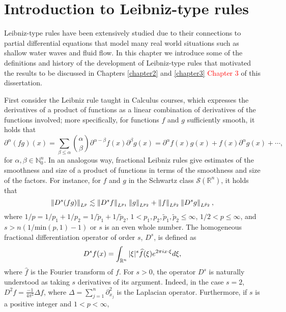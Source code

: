 
\cleardoublepage


\chapter{Introduction to Leibniz-type rules}
\label{makereference1}

Leibniz-type rules have been extensively studied due to their connections to partial differential equations that model many real world situations such as shallow water waves and fluid flow. In this chapter we introduce some of the definitions and history of the development of Leibniz-type rules that motivated the results to be discussed in Chapters \ref{chapter2} and \ref{chapter3} \textcolor{red}{Chapter 3} of this dissertation. 

First consider the Leibniz rule taught in Calculus courses, which expresses the derivatives of a product of functions as a linear combination of derivatives of the functions involved; more specifically, for functions $f$ and $g$ sufficiently smooth, it holds that
\[\partial^\alpha (fg)(x) = \sum_{\beta \leq \alpha} \binom{\alpha}{\beta} \partial^{\alpha - \beta} f(x) \partial^{\beta} g(x) = \partial^\alpha f(x) g(x) + f(x) \partial^\alpha g(x) + \cdots ,\]
for $\alpha,\beta \in \mathbb{N}^n_0$.
In an analogous way, fractional Leibniz rules give estimates of the smoothness and size of a product of functions in terms of the smoothness and size of the factors. For instance, for $f$ and $g$ in the Schwartz class $\mathcal{S}(\mathbb{R}^n)$, it holds that
\begin{equation}\label{def:leibniz}
\left\|D^s (fg)\right\|_{L^p} \lesssim \left\|D^s f\right\|_{L^{p_1}}\left\|g\right\|_{L^{p_2}} + \left\|f\right\|_{L^{\tilde{p}_2}}\left\|D^s g\right\|_{L^{\tilde{p}_2}},
\end{equation}
where $1/p = 1/p_1 + 1/p_2 =  1/\tilde{p}_1 + 1/\tilde{p}_2$, $1<p_1,p_2,\tilde{p}_1,\tilde{p}_2\leq \infty$, $1/2 <p\leq \infty$, and $s>n(1/\text{min}(p,1) - 1)$ or $s$ is an even whole number. The homogeneous fractional differentiation operator of order $s$, $D^s$, is defined as \[D^s f(x) = \int_{{\mathbb R}^n} |\xi|^s \widehat{f}(\xi) e^{2\pi i x\cdot \xi} d\xi,\]
where $\widehat{f}$ is the Fourier transform of $f$.
For $s>0$, the operator $D^s$ is naturally understood as taking $s$ derivatives of its argument. Indeed, in the case $s=2$, $D^2f = \frac{-1}{4\pi^2}\Delta f$, where $\Delta = \sum_{j=1}^n \partial^2_{x_j}$ is the Laplacian operator. Furthermore, if $s$ is a positive integer and $1<p<\infty$,

